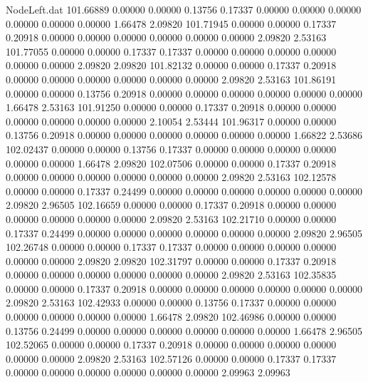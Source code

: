 \begin{filecontents}{NodeLeft.dat}
 101.66889    0.00000    0.00000     0.13756    0.17337    0.00000    0.00000    0.00000    0.00000    0.00000    0.00000    1.66478    2.09820
 101.71945    0.00000    0.00000     0.17337    0.20918    0.00000    0.00000    0.00000    0.00000    0.00000    0.00000    2.09820    2.53163
 101.77055    0.00000    0.00000     0.17337    0.17337    0.00000    0.00000    0.00000    0.00000    0.00000    0.00000    2.09820    2.09820
 101.82132    0.00000    0.00000     0.17337    0.20918    0.00000    0.00000    0.00000    0.00000    0.00000    0.00000    2.09820    2.53163
 101.86191    0.00000    0.00000     0.13756    0.20918    0.00000    0.00000    0.00000    0.00000    0.00000    0.00000    1.66478    2.53163
 101.91250    0.00000    0.00000     0.17337    0.20918    0.00000    0.00000    0.00000    0.00000    0.00000    0.00000    2.10054    2.53444
 101.96317    0.00000    0.00000     0.13756    0.20918    0.00000    0.00000    0.00000    0.00000    0.00000    0.00000    1.66822    2.53686
 102.02437    0.00000    0.00000     0.13756    0.17337    0.00000    0.00000    0.00000    0.00000    0.00000    0.00000    1.66478    2.09820
 102.07506    0.00000    0.00000     0.17337    0.20918    0.00000    0.00000    0.00000    0.00000    0.00000    0.00000    2.09820    2.53163
 102.12578    0.00000    0.00000     0.17337    0.24499    0.00000    0.00000    0.00000    0.00000    0.00000    0.00000    2.09820    2.96505
 102.16659    0.00000    0.00000     0.17337    0.20918    0.00000    0.00000    0.00000    0.00000    0.00000    0.00000    2.09820    2.53163
 102.21710    0.00000    0.00000     0.17337    0.24499    0.00000    0.00000    0.00000    0.00000    0.00000    0.00000    2.09820    2.96505
 102.26748    0.00000    0.00000     0.17337    0.17337    0.00000    0.00000    0.00000    0.00000    0.00000    0.00000    2.09820    2.09820
 102.31797    0.00000    0.00000     0.17337    0.20918    0.00000    0.00000    0.00000    0.00000    0.00000    0.00000    2.09820    2.53163
 102.35835    0.00000    0.00000     0.17337    0.20918    0.00000    0.00000    0.00000    0.00000    0.00000    0.00000    2.09820    2.53163
 102.42933    0.00000    0.00000     0.13756    0.17337    0.00000    0.00000    0.00000    0.00000    0.00000    0.00000    1.66478    2.09820
 102.46986    0.00000    0.00000     0.13756    0.24499    0.00000    0.00000    0.00000    0.00000    0.00000    0.00000    1.66478    2.96505
 102.52065    0.00000    0.00000     0.17337    0.20918    0.00000    0.00000    0.00000    0.00000    0.00000    0.00000    2.09820    2.53163
 102.57126    0.00000    0.00000     0.17337    0.17337    0.00000    0.00000    0.00000    0.00000    0.00000    0.00000    2.09963    2.09963

\end{filecontents}
